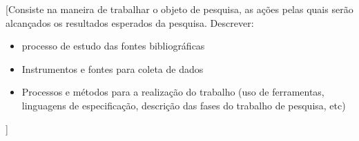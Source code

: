 
[Consiste na maneira de trabalhar o objeto de pesquisa, as ações pelas quais serão alcançados os resultados esperados da pesquisa.
Descrever:
\begin{itemize}
	\item processo de estudo das fontes bibliográficas
	\item Instrumentos e fontes para coleta de dados
	\item Processos e métodos para a realização do trabalho (uso de ferramentas, linguagens de especificação, descrição das fases do trabalho de pesquisa, etc)
\end{itemize}
]
